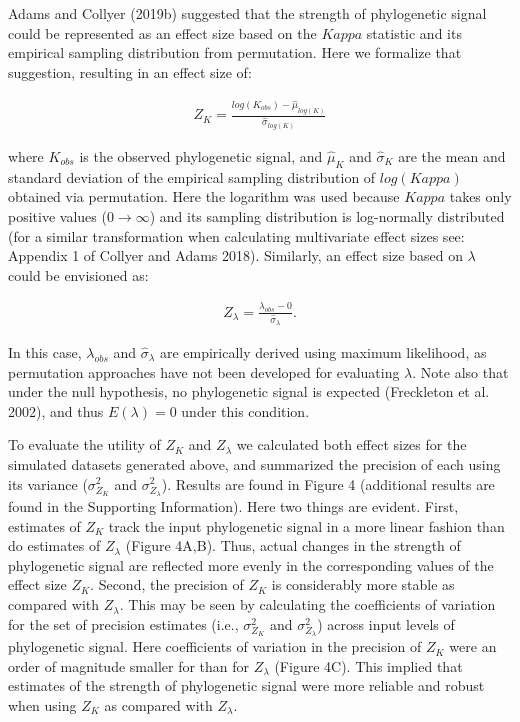 \documentclass[
]{article}
\begin{document}
Adams and Collyer (2019b) suggested that the strength of phylogenetic
signal could be represented as an effect size based on the \(Kappa\)
statistic and its empirical sampling distribution from permutation. Here
we formalize that suggestion, resulting in an effect size of:

\begin{align}
    Z_{K}=\frac{log(K_{obs})-\hat\mu_{log(K)}}{\hat\sigma_{log(K)}}
\end{align}

where \(K_{obs}\) is the observed phylogenetic signal, and \(\hat\mu_K\)
and \(\hat\sigma_K\) are the mean and standard deviation of the
empirical sampling distribution of \(log(Kappa)\) obtained via
permutation. Here the logarithm was used because \(Kappa\) takes only
positive values (\(0\to\infty\)) and its sampling distribution is
log-normally distributed (for a similar transformation when calculating
multivariate effect sizes see: Appendix 1 of Collyer and Adams 2018).
Similarly, an effect size based on \(\lambda\) could be envisioned as:

\begin{align}
    Z_{\lambda}=\frac{\lambda_{obs}-0}{\hat\sigma_\lambda}.
\end{align}

In this case, \(\lambda_{obs}\) and \(\hat\sigma_\lambda\) are
empirically derived using maximum likelihood, as permutation approaches
have not been developed for evaluating \(\lambda\). Note also that under
the null hypothesis, no phylogenetic signal is expected (Freckleton et
al. 2002), and thus \(E(\lambda)=0\) under this condition. \hfill\break

To evaluate the utility of \(Z_K\) and \(Z_\lambda\) we calculated both
effect sizes for the simulated datasets generated above, and summarized
the precision of each using its variance (\(\sigma^2_{Z_K}\) and
\(\sigma^2_{Z_\lambda}\)). Results are found in Figure 4 (additional
results are found in the Supporting Information). Here two things are
evident. First, estimates of \(Z_K\) track the input phylogenetic signal
in a more linear fashion than do estimates of \(Z_\lambda\) (Figure
4A,B). Thus, actual changes in the strength of phylogenetic signal are
reflected more evenly in the corresponding values of the effect size
\(Z_K\). Second, the precision of \(Z_K\) is considerably more stable as
compared with \(Z_\lambda\). This may be seen by calculating the
coefficients of variation for the set of precision estimates (i.e.,
\(\sigma^2_{Z_K}\) and \(\sigma^2_{Z_\lambda}\)) across input levels of
phylogenetic signal. Here coefficients of variation in the precision of
\(Z_K\) were an order of magnitude smaller for than for \(Z_\lambda\)
(Figure 4C). This implied that estimates of the strength of phylogenetic
signal were more reliable and robust when using \(Z_K\) as compared with
\(Z_\lambda\). \hfill\break
\end{document}
